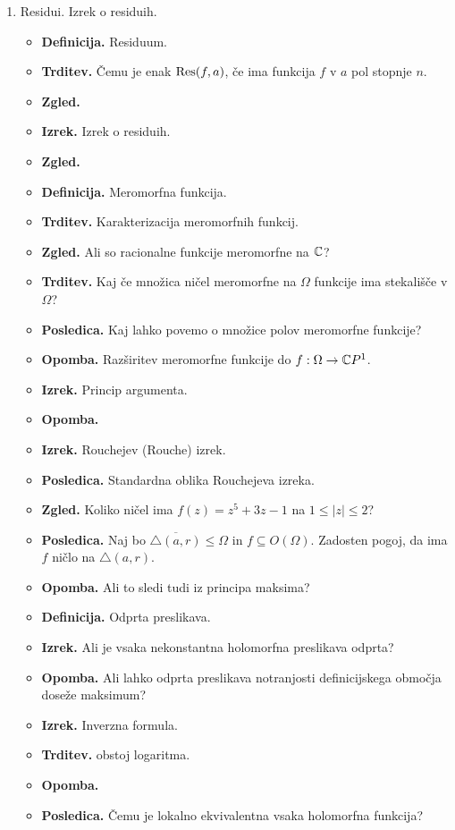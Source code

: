 \begin{enumerate}
    \item Residui. Izrek o residuih.
    \begin{itemize}
        \item \textbf{Definicija.} Residuum.
        \item \textbf{Trditev.} Čemu je enak \(\operatorname{Res}(f, a)\), če ima funkcija \(f\) v \(a\) pol stopnje \(n\).
        \item \textbf{Zgled.} 
        \item \textbf{Izrek.} Izrek o residuih.
        \item \textbf{Zgled.} 
        \item \textbf{Definicija.} Meromorfna funkcija. 
        \item \textbf{Trditev.} Karakterizacija meromorfnih funkcij.
        \item \textbf{Zgled.} Ali so racionalne funkcije meromorfne na \(\mathbb{C}\)?
        \item \textbf{Trditev.} Kaj če množica ničel meromorfne na \(\Omega\) funkcije ima stekališče v \(\Omega\)?
        \item \textbf{Posledica.} Kaj lahko povemo o množice polov meromorfne funkcije?
        \item \textbf{Opomba.} Razširitev meromorfne funkcije do \(f: \Omega \to \mathbb{C} P^1\).
        \item \textbf{Izrek.} Princip argumenta.
        \item \textbf{Opomba.} \todo{}
        \item \textbf{Izrek.} Rouchejev (Rouche) izrek.
        \item \textbf{Posledica.} Standardna oblika Rouchejeva izreka.
        \item \textbf{Zgled.} Koliko ničel ima \(f(z) = z^5 + 3z - 1\) na \(1 \leq |z| \leq 2\)?
        \item \textbf{Posledica.} Naj bo \(\overline{\triangle(a, r)} \leq \Omega\) in \(f \subseteq O(\Omega)\). Zadosten pogoj, da ima \(f\) ničlo na \(\triangle(a, r)\).
        \item \textbf{Opomba.} Ali to sledi tudi iz principa maksima?
        \item \textbf{Definicija.} Odprta preslikava.
        \item \textbf{Izrek.} Ali je vsaka nekonstantna holomorfna preslikava odprta?
        \item \textbf{Opomba.} Ali lahko odprta preslikava notranjosti definicijskega območja doseže maksimum?
        \item \textbf{Izrek.} Inverzna formula.
        \item \textbf{Trditev.} obstoj logaritma.
        \item \textbf{Opomba.} \todo{}
        \item \textbf{Posledica.} Čemu je lokalno ekvivalentna vsaka holomorfna funkcija? 
    \end{itemize}

\end{enumerate}